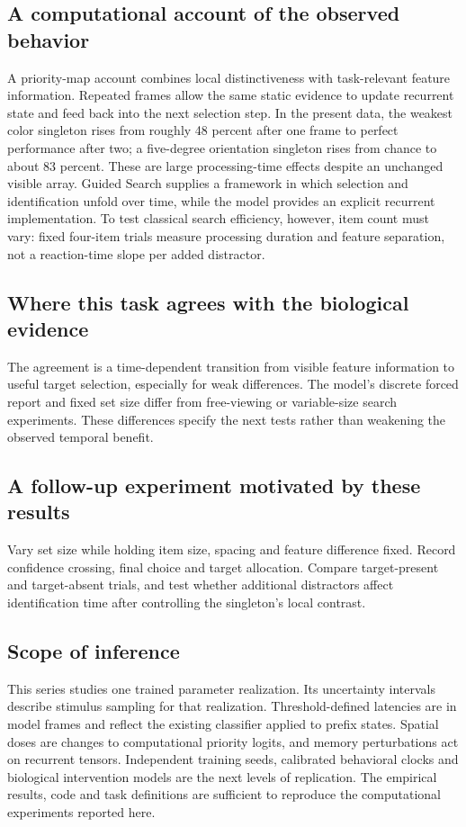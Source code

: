 \documentclass[11pt]{article}
\begin{document}
\subsection{A computational account of the observed behavior}
A priority-map account combines local distinctiveness with task-relevant feature information. Repeated frames allow the same static evidence to update recurrent state and feed back into the next selection step. In the present data, the weakest color singleton rises from roughly 48 percent after one frame to perfect performance after two; a five-degree orientation singleton rises from chance to about 83 percent. These are large processing-time effects despite an unchanged visible array. Guided Search supplies a framework in which selection and identification unfold over time, while the model provides an explicit recurrent implementation. To test classical search efficiency, however, item count must vary: fixed four-item trials measure processing duration and feature separation, not a reaction-time slope per added distractor. \cite{bio_wolfe}

\subsection{Where this task agrees with the biological evidence}
The agreement is a time-dependent transition from visible feature information to useful target selection, especially for weak differences. The model’s discrete forced report and fixed set size differ from free-viewing or variable-size search experiments. These differences specify the next tests rather than weakening the observed temporal benefit.

\subsection{A follow-up experiment motivated by these results}
Vary set size while holding item size, spacing and feature difference fixed. Record confidence crossing, final choice and target allocation. Compare target-present and target-absent trials, and test whether additional distractors affect identification time after controlling the singleton’s local contrast.
\subsection{Scope of inference}
This series studies one trained parameter realization. Its uncertainty intervals describe stimulus sampling for that realization. Threshold-defined latencies are in model frames and reflect the existing classifier applied to prefix states. Spatial doses are changes to computational priority logits, and memory perturbations act on recurrent tensors. Independent training seeds, calibrated behavioral clocks and biological intervention models are the next levels of replication. The empirical results, code and task definitions are sufficient to reproduce the computational experiments reported here.
\end{document}

